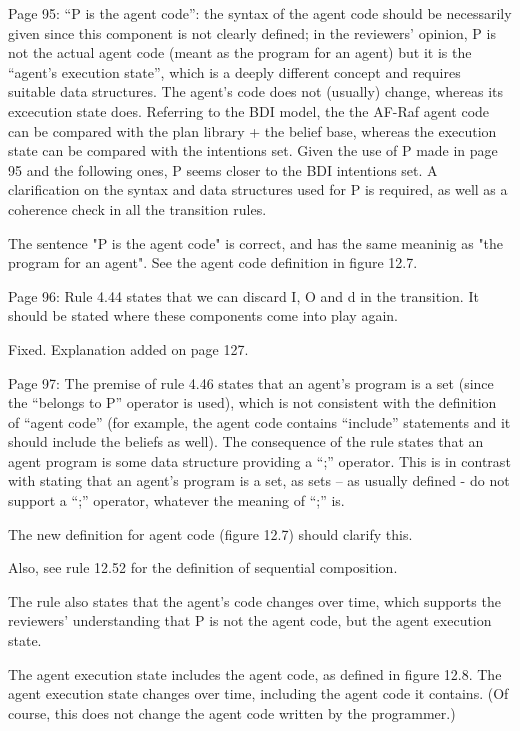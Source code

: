 \documentclass{article}
\newenvironment{them}{\noindent\begingroup\color{blue}}{\endgroup\par}
\begin{document}
\begin{them}

Page 95:
“P is the agent code”: the syntax of the agent code should be necessarily given
since this component is not clearly defined; in the reviewers' opinion, P is
not the actual agent code (meant as the program for an agent) but it is the
“agent's execution state”, which is a deeply different concept and requires
suitable data structures. The agent's code does not (usually) change, whereas
its excecution state does. Referring to the BDI model, the the AF-Raf agent
code can be compared with the plan library + the belief base, whereas the
execution state can be compared with the intentions set. Given the use of P
made in page 95 and the following ones, P seems closer to the BDI intentions
set. A clarification on the syntax and data structures used for P is required,
as well as a coherence check in all the transition rules.

\end{them}
The sentence "P is the agent code" is correct, and has the same meaninig as "the
program for an agent". See the agent code definition in figure 12.7. 

\begin{them}

Page 96:
Rule 4.44 states that we can discard I, O and d in the transition. It should be
stated where these components come into play again.

\end{them}
Fixed. Explanation added on page 127.

\begin{them}

Page 97:
The premise of rule 4.46 states that an agent's program is a set (since the
“belongs to P” operator is used), which is not consistent with the definition
of “agent code” (for example, the agent code contains “include” statements and
it should include the beliefs as well). The consequence of the rule states that
an agent program is some data structure providing a “;” operator. This is in
contrast with stating that an agent's program is a set, as sets – as usually
defined - do not support a “;” operator, whatever the meaning of “;” is.

\end{them}
The new definition for agent code (figure 12.7) should clarify this.

Also, see rule 12.52 for the definition of sequential composition.


\begin{them}

The rule also states that the agent's code changes over time, which supports
the reviewers' understanding that P is not the agent code, but the agent
execution state.

\end{them}
The agent execution state includes the agent code, as defined in figure 12.8. The agent execution state changes over time,
  including the agent code it contains.
(Of course, this does not change the agent code written by the programmer.)
\end{document}
